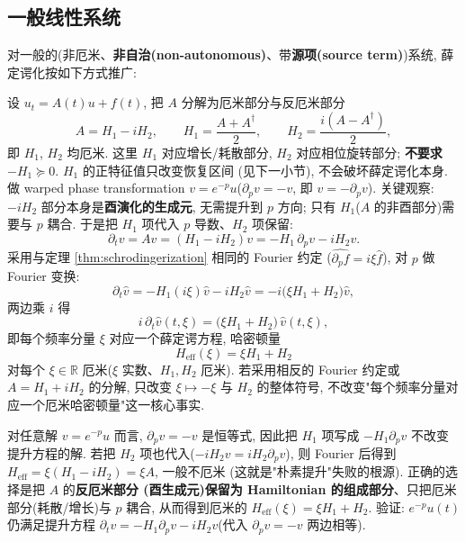 \documentclass[utf8]{article} %
\numberwithin{equation}{section}   %
\newtheorem{Thm}{\hskip 2em {\color{blue} 定理}}[subsection]
\newtheorem{Note}{\hskip 2em {\color{red} 注}}[subsection]
\begin{document}
\subsection{一般线性系统}

对一般的(非厄米、\textbf{非自治(non-autonomous)}、带\textbf{源项(source term)})系统, 薛定谔化按如下方式推广:

\begin{Thm}[一般情形的薛定谔化]
    设 $u_t = A(t)u + f(t)$, 把 $A$ 分解为厄米部分与反厄米部分
    \begin{equation}
        A = H_1 - iH_2, \qquad
        H_1 = \frac{A + A^\dagger}{2}, \qquad
        H_2 = \frac{i(A - A^\dagger)}{2},
    \end{equation}
    即 $H_1$, $H_2$ 均厄米. 这里 $H_1$ 对应增长/耗散部分, $H_2$ 对应相位旋转部分;
    \textbf{不要求} $-H_1 \succeq 0$. $H_1$ 的正特征值只改变恢复区间
    (见下一小节), 不会破坏薛定谔化本身.
    做 warped phase transformation $v = e^{-p}u$($\partial_p v = -v$, 即 $v = -\partial_p v$).
    关键观察: $-iH_2$ 部分本身是\textbf{酉演化的生成元}, 无需提升到 $p$ 方向;
    只有 $H_1$($A$ 的非酉部分)需要与 $p$ 耦合. 于是把 $H_1$ 项代入 $p$ 导数、$H_2$ 项保留:
    \begin{equation}
        \partial_t v = Av = (H_1 - iH_2)v = -H_1\,\partial_p v - iH_2 v.
    \end{equation}
    采用与定理 \ref{thm:schrodingerization} 相同的 Fourier 约定
    ($\widehat{\partial_p f} = i\xi\hat f$), 对 $p$ 做 Fourier 变换:
    \begin{equation}
        \partial_t \hat v = -H_1(i\xi)\hat v - iH_2\hat v = -i\big(\xi H_1 + H_2\big)\hat v,
    \end{equation}
    两边乘 $i$ 得
    \begin{equation}
        i\, \partial_t \hat v(t, \xi) = \big(\xi H_1 + H_2\big)\, \hat v(t, \xi),
        \label{eq:schr-general}
    \end{equation}
    即每个频率分量 $\xi$ 对应一个薛定谔方程, 哈密顿量
    \begin{equation}
        H_{\mathrm{eff}}(\xi) = \xi H_1 + H_2
    \end{equation}
    对每个 $\xi \in \mathbb R$ 厄米($\xi$ 实数、$H_1,H_2$ 厄米).
    若采用相反的 Fourier 约定或 $A = H_1 + iH_2$ 的分解, 只改变 $\xi \mapsto -\xi$ 与
    $H_2$ 的整体符号, 不改变"每个频率分量对应一个厄米哈密顿量"这一核心事实.
\end{Thm}

\begin{Note}
    对任意解 $v = e^{-p}u$ 而言, $\partial_p v = -v$ 是恒等式, 因此把 $H_1$ 项写成
    $-H_1\partial_p v$ 不改变提升方程的解. 若把 $H_2$ 项也代入($-iH_2v = iH_2\partial_p v$),
    则 Fourier 后得到 $H_{\mathrm{eff}} = \xi(H_1 - iH_2) = \xi A$, 一般不厄米
    (这就是"朴素提升"失败的根源). 正确的选择是把 $A$ 的\textbf{反厄米部分
    (酉生成元)保留为 Hamiltonian 的组成部分}、只把厄米部分(耗散/增长)与 $p$ 耦合,
    从而得到厄米的 $H_{\mathrm{eff}}(\xi) = \xi H_1 + H_2$.
    验证: $e^{-p}u(t)$ 仍满足提升方程
    $\partial_t v = -H_1\partial_p v - iH_2 v$(代入 $\partial_p v = -v$ 两边相等).
\end{Note}
\end{document}
